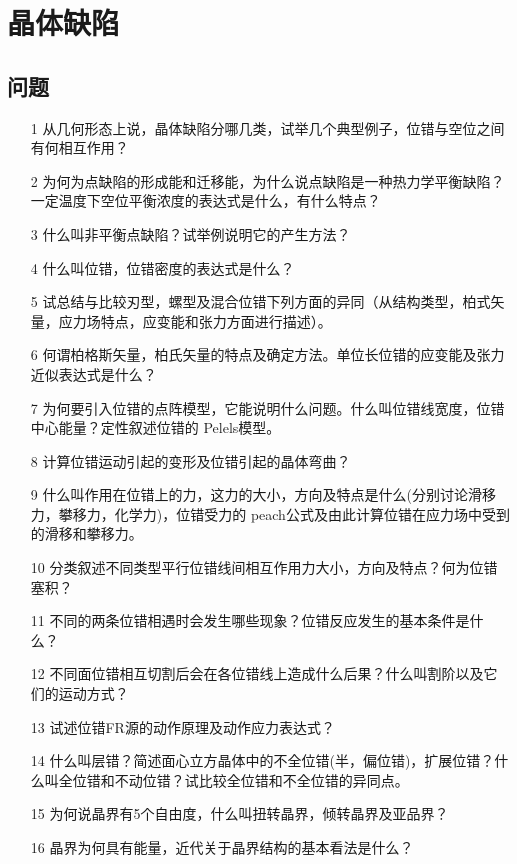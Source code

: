 \chapter{晶体缺陷}
    \section{问题}
    \begin{itemize}
        \item[1] 从几何形态上说，晶体缺陷分哪几类，试举几个典型例子，位错与空位之间有何相互作用？
        \item[2] 为何为点缺陷的形成能和迁移能，为什么说点缺陷是一种热力学平衡缺陷？一定温度下空位平衡浓度的表达式是什么，有什么特点？
        \item[3] 什么叫非平衡点缺陷？试举例说明它的产生方法？
        \item[4] 什么叫位错，位错密度的表达式是什么？
        \item[5] 试总结与比较刃型，螺型及混合位错下列方面的异同（从结构类型，柏式矢量，应力场特点，应变能和张力方面进行描述）。
        \item[6] 何谓柏格斯矢量，柏氏矢量的特点及确定方法。单位长位错的应变能及张力近似表达式是什么？
        \item[7] 为何要引入位错的点阵模型，它能说明什么问题。什么叫位错线宽度，位错中心能量？定性叙述位错的 Pelels模型。
        \item[8] 计算位错运动引起的变形及位错引起的晶体弯曲？
        \item[9] 什么叫作用在位错上的力，这力的大小，方向及特点是什么(分别讨论滑移力，攀移力，化学力)，位错受力的 peach公式及由此计算位错在应力场中受到的滑移和攀移力。 
        \item[10] 分类叙述不同类型平行位错线间相互作用力大小，方向及特点？何为位错塞积？
        \item[11] 不同的两条位错相遇时会发生哪些现象？位错反应发生的基本条件是什么？
        \item[12] 不同面位错相互切割后会在各位错线上造成什么后果？什么叫割阶以及它们的运动方式？
        \item[13] 试述位错FR源的动作原理及动作应力表达式？
        \item[14] 什么叫层错？简述面心立方晶体中的不全位错(半，偏位错)，扩展位错？什么叫全位错和不动位错？试比较全位错和不全位错的异同点。
        \item[15] 为何说晶界有5个自由度，什么叫扭转晶界，倾转晶界及亚品界？
        \item[16] 晶界为何具有能量，近代关于晶界结构的基本看法是什么？
    \end{itemize}